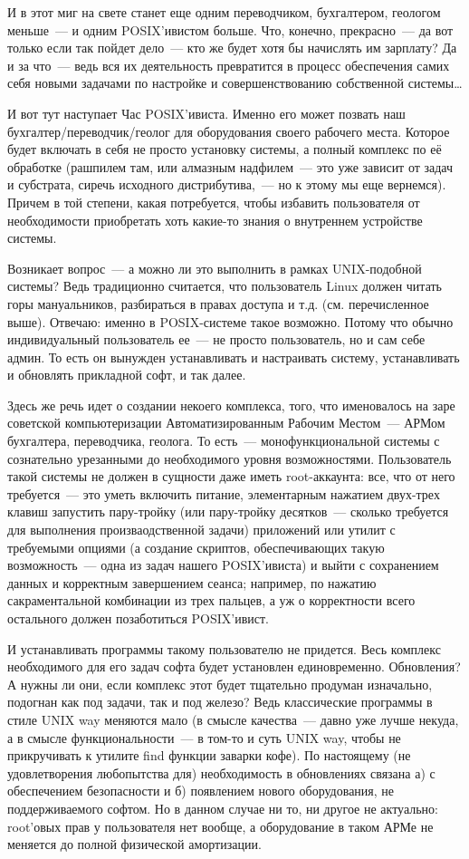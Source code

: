И в этот миг на свете станет еще одним переводчиком, бухгалтером, геологом меньше~--- и одним POSIX'ивистом больше. Что, конечно, прекрасно~--- да вот только если так пойдет дело~--- кто же будет хотя бы начислять им зарплату? Да и за что~--- ведь вся их деятельность превратится в процесс обеспечения самих себя новыми задачами по настройке и совершенствованию собственной системы\dots

И вот тут наступает Час POSIX'ивиста. Именно его может позвать наш бухгалтер/переводчик/геолог для оборудования своего рабочего места. Которое будет включать в себя не просто установку системы, а полный комплекс по её обработке (рашпилем там, или алмазным надфилем~--- это уже зависит от задач и субстрата, сиречь исходного дистрибутива,~--- но к этому мы еще вернемся). Причем в той степени, какая потребуется, чтобы избавить пользователя от необходимости приобретать хоть какие-то знания о внутреннем устройстве системы.

Возникает вопрос~--- а можно ли это выполнить в рамках UNIX-подобной системы? Ведь традиционно считается, что пользователь Linux должен читать горы мануальников, разбираться в правах доступа и т.д. (см. перечисленное выше). Отвечаю: именно в POSIX-системе такое возможно. Потому что обычно индивидуальный пользователь ее~--- не просто пользователь, но и сам себе админ. То есть он вынужден устанавливать и настраивать систему, устанавливать и обновлять прикладной софт, и так далее.

Здесь же речь идет о создании некоего комплекса, того, что именовалось на заре советской компьютеризации Автоматизированным Рабочим Местом~--- АРМом бухгалтера, переводчика, геолога. То есть~--- монофункциональной системы с сознательно урезанными до необходимого уровня возможностями. Пользователь такой системы не должен в сущности даже иметь root-аккаунта: все, что от него требуется~--- это уметь включить питание, элементарным нажатием двух-трех клавиш запустить пару-тройку (или пару-тройку десятков~--- сколько требуется для выполнения произваодственной задачи) приложений или утилит с требуемыми опциями (а создание скриптов, обеспечивающих такую возможность~--- одна из задач нашего POSIX'ивиста) и выйти с сохранением данных и корректным завершением сеанса; например, по нажатию сакраментальной комбинации из трех пальцев, а уж о корректности всего остального должен позаботиться POSIX'ивист.

И устанавливать программы такому пользователю не придется. Весь комплекс необходимого для его задач софта будет установлен единовременно. Обновления? А нужны ли они, если комплекс этот будет тщательно продуман изначально, подогнан как под задачи, так и под железо? Ведь классические программы в стиле UNIX way меняются мало (в смысле качества~--- давно уже лучше некуда, а в смысле функциональности~--- в том-то и суть UNIX way, чтобы не прикручивать к утилите find функции заварки кофе). По настоящему (не удовлетворения любопытства для) необходимость в обновлениях связана а) с обеспечением безопасности и б) появлением нового оборудования, не поддерживаемого софтом. Но в данном случае ни то, ни другое не актуально: root'овых прав у пользователя нет вообще, а оборудование в таком АРМе не меняется до полной физической амортизации.

